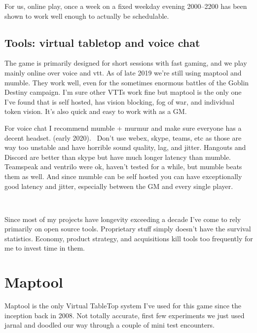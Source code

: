 For us, online play, once a week on a fixed weekday evening 2000--2200 has been shown to work well enough to actually be schedulable.


\subsection*{Tools: virtual tabletop and voice chat}
The game is primarily designed for short sessions with fast gaming, and we play mainly online over voice and vtt. As of late 2019 we're still using maptool and mumble. They work well, even for the sometimes enormous battles of the Goblin Destiny campaign. I'm sure other VTTs work fine but maptool is the only one I've found that is self hosted, has vision blocking, fog of war, and individual token vision. It's also quick and easy to work with as a GM. 

For voice chat I recommend mumble + murmur and make sure everyone has a decent headset. \vvsmall(early 2020)\normalsize.~ Don't use webex, skype, teams, etc as those are way too unstable and have horrible sound quality, lag, and jitter. Hangouts and Discord are better than skype but have much longer latency than mumble. Teamspeak and ventrilo were ok, haven't tested for a while, but mumble beats them as well. And since mumble can be self hosted you can have exceptionally good latency and jitter, especially between the GM and every single player. 

\

Since most of my projects have longevity exceeding a decade I've come to rely primarily on open source tools. Proprietary stuff simply doesn't have the survival statistics. Economy, product strategy, and acquisitions kill tools too frequently for me to invest time in them.








\section*{Maptool}
Maptool is the only Virtual TableTop system I've used for this game since the inception back in 2008. Not totally accurate, first few experiments we just used jarnal and doodled our way through a couple of mini test encounters.


